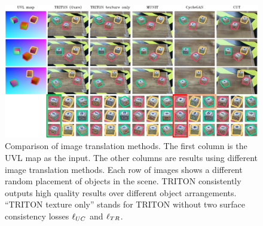 \documentclass{article}
\begin{document}


\begin{figure}[th]
	\begin{center}
		\includegraphics[width=.9\textwidth]{../images/frame_inconsistency.pdf}
	\end{center}
	\vspace{-7pt}
	\caption{
	    Comparison of image translation methods.
	    The first column is the UVL map as the input.
	    The other columns are results using different image translation methods.
		Each row of images shows a different random placement of objects in the scene.
		TRITON consistently outputs high quality results over different object arrangements. 
		``TRITON texture only'' stands for TRITON without two surface consistency losses $\ell_{UC}$ and $\ell_{TR}$.
		}
		\vspace{-15pt}
		\label{fig:frame_inconsistency_diagram}
	\end{figure}
	
\end{document}
